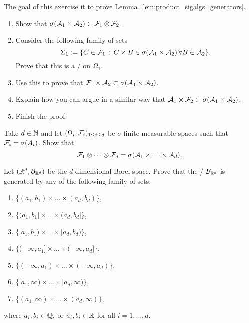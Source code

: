 \begin{problem}\label{prb:product_sigalgs_generators}
The goal of this exercise it to prove Lemma~\ref{lem:product_sigalgs_generators}.
\begin{enumerate}[label={(\alph*)}]
\item Show that $\sigma(\mathcal A_1 \times \mathcal A_2) \subset \mathcal F_1 \otimes \mathcal F_2$.
\item Consider the following family of sets
\[
	\Sigma_1 := \{C \in \mathcal F_1 \, : \, C \times B \in \sigma(\mathcal A_1 \times \mathcal A_2) \, \forall B \in \mathcal A_2\}.
\]
Prove that this is a \sigalg/ on $\Omega_1$.
\item Use this to prove that $\mathcal F_1 \times \mathcal A_2 \subset \sigma(\mathcal A_1 \times \mathcal A_2)$.
\item Explain how you can argue in a similar way that $\mathcal A_1 \times \mathcal F_2 \subset \sigma(\mathcal A_1 \times \mathcal A_2)$.
\item Finish the proof.
\end{enumerate}
\end{problem}

\begin{problem}
Take $d \in \mathbb N$ and let $(\Omega_i, \mathcal F_i)_{1 \le i \le d}$ be $\sigma$-finite measurable spaces such that $\mathcal F_i = \sigma(A_i)$. Show that
\[
	\mathcal F_1 \otimes \dots \otimes \mathcal F_d = \sigma(\mathcal A_1 \times \dots \times \mathcal A_d).
\]
\end{problem}

\begin{problem}
Let $(\mathbb R^d, \mathcal B_{\mathbb R^d})$ be the $d$-dimensional Borel space. Prove that the \sigalg/ $\mathcal B_{\mathbb R^d}$ is generated by any of the following family of sets:
\begin{enumerate}[label={(\alph*)}]
\item $\{(a_1, b_1) \times \dots \times (a_d,b_d)\}$,
\item $\{(a_1, b_1] \times \dots \times (a_d,b_d]\}$,
\item $\{[a_1, b_1) \times \dots \times [a_d,b_d)\}$,
\item $\{(-\infty,a_1] \times \dots \times (-\infty,a_d]\}$,
\item $\{(-\infty,a_1) \times \dots \times (-\infty, a_d)\}$,
\item $\{[a_1, \infty) \times \dots \times [a_d, \infty)\}$,
\item $\{(a_1,\infty) \times \dots \times (a_d, \infty)\}$,
\end{enumerate}
where $a_i, b_i \in \mathbb Q,$ or $a_i, b_i \in \mathbb R$ for all $i = 1, \dots, d$.
\end{problem}


